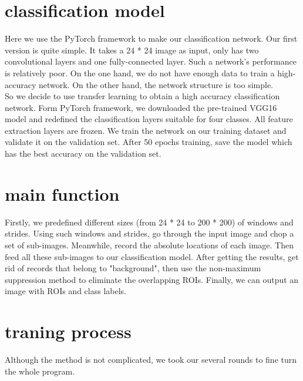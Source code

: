 \documentclass[10pt,a4paper]{report}
\begin{document}
\section{classification model}
Here we use the PyTorch framework to make our classification network. Our first version is quite simple. It takes a 24 * 24 image as input, only has two convolutional layers and one fully-connected layer. Such a network's performance is relatively poor. On the one hand, we do not have enough data to train a high-accuracy network. On the other hand, the network structure is too simple.\\
So we decide to use transfer learning to obtain a high accuracy classification network. Form PyTorch framework, we downloaded the pre-trained VGG16 model and redefined the classification layers suitable for four classes. All feature extraction layers are frozen. We train the network on our training dataset and validate it on the validation set. After 50 epochs training, save the model which has the best accuracy on the validation set.
\section{main function}
Firstly, we predefined different sizes (from 24 * 24 to 200 * 200) of windows and strides. Using such windows and strides, go through the input image and chop a set of sub-images. Meanwhile, record the absolute locations of each image. Then feed all these sub-images to our classification model. After getting the results, get rid of records that belong to "background", then use the non-maximum suppression method to eliminate the overlapping ROIs. Finally, we can output an image with ROIs and class labels.  
\section{traning process}
Although the method is not complicated, we took our several rounds to fine turn the whole program.
\end{document}
